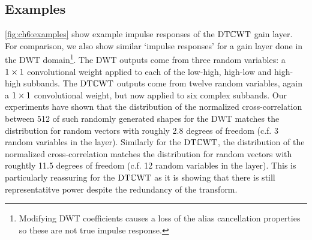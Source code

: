 \subsection{Examples}
\autoref{fig:ch6:examples} show example impulse responses of the $\mathrm{DT}\mathbb{C}\mathrm{WT}$ gain
layer. For comparison, we also show similar `impulse responses' for a gain layer
done in the DWT domain\footnote{Modifying DWT coefficients causes a loss of the
alias cancellation properties so these are not true impulse response.}. The DWT 
outputs come from three random variables: a $1\times 1$ 
convolutional weight applied to each of the low-high, high-low and high-high
subbands. The $\mathrm{DT}\mathbb{C}\mathrm{WT}$ outputs come from twelve random variables, again a $1\times
1$ convolutional weight, but now applied to six complex subbands. 
Our experiments have shown that the distribution of the normalized
cross-correlation between 512 of such randomly generated shapes for the DWT matches the
distribution for random vectors with roughly 2.8 degrees of freedom (c.f. 3
random variables in the layer). Similarly for the $\mathrm{DT}\mathbb{C}\mathrm{WT}$, the distribution of
the normalized cross-correlation matches the distribution for random vectors
with roughtly 11.5 degrees of freedom (c.f. 12 random variables in the layer).
This is particularly reassuring for the $\mathrm{DT}\mathbb{C}\mathrm{WT}$ as it is showing that there is
still representatitve power despite the redundancy of the transform.

\begin{figure}
  \centering
  \newline
  \label{fig:ch6:examples}
\end{figure}


